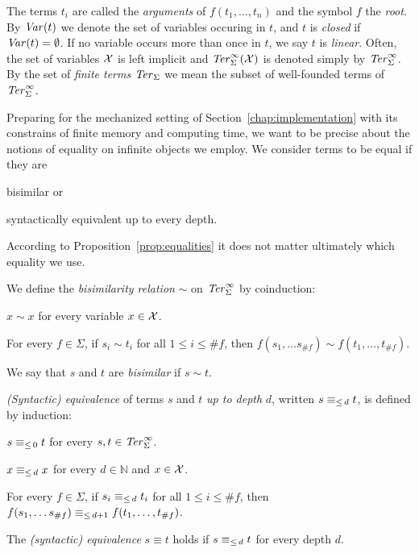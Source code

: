 The terms $t_i$ are called the \emph{arguments} of $f(t_1, \ldots, t_n)$ and
the symbol $f$ the \emph{root}. By $\mathit{Var}(t)$ we denote the set of variables
occuring in $t$, and $t$ is \emph{closed} if $\mathit{Var}(t) = \emptyset$. If no
variable occurs more than once in $t$, we say $t$ is \emph{linear}.
Often, the set of variables $\mathcal{X}$ is left implicit and $\mathit{Ter}_\Sigma^\infty(\mathcal{X})$ is
denoted simply by $\mathit{Ter}_\Sigma^\infty$. By the set of \emph{finite terms} $\mathit{Ter}_\Sigma$ we
mean the subset of well-founded terms of $\mathit{Ter}_\Sigma^\infty$.

Preparing for the mechanized setting of Section~\ref{chap:implementation} with
its constrains of finite memory and computing time, we want to be precise
about the notions of equality on infinite objects we employ. We consider terms
to be equal if they are
\begin{inparaenum}[(i)]
  \item bisimilar or
  \item syntactically equivalent up to every depth.
\end{inparaenum}
According to Proposition~\ref{prop:equalities} it does not matter
ultimately which equality we use.

\begin{definition}\label{def:bisimilarity}%
We define the \emph{bisimilarity relation} $\sim$ on $\mathit{Ter}_\Sigma^\infty$ by
coinduction:
\begin{compactenum}
  \item
    $x \sim x$ for every variable $x \in \mathcal{X}$.
  \item
    For every $f \in \Sigma$, if $s_i \sim t_i$ for all $1 \leq i \leq \#f$,
    then $f(s_1, \ldots s_{\#f}) \sim f(t_1, \ldots, t_{\#f})$.
\end{compactenum}
We say that $s$ and $t$ are \emph{bisimilar} if $s \sim t$.
\end{definition}

\begin{definition}\label{def:equiv}%
\emph{(Syntactic) equivalence} of terms $s$ and $t$ \emph{up to depth} $d$,
written $s \equiv_{\le \, d} t$, is defined by induction:
\begin{compactenum}
  \item $s \equiv_{\le \, 0} t$ for every $s, t \in \mathit{Ter}_\Sigma^\infty$.
  \item $x \equiv_{\le \, d} x$ for every $d \in \mathbb{N}$ and $x \in \mathcal{X}$.
  \item For every $f \in \Sigma$, if $s_i \equiv_{\le \, d} t_i$ for all $1 \leq i
    \leq \#f$, then $f(s_1, \ldots s_{\#f}) \equiv_{\le \, d+1} f(t_1, \ldots,
    t_{\#f})$.
\end{compactenum}
The \emph{(syntactic) equivalence} $s \equiv t$ holds if $s \equiv_{\le \, d} t$ for
every depth $d$.
\end{definition}

